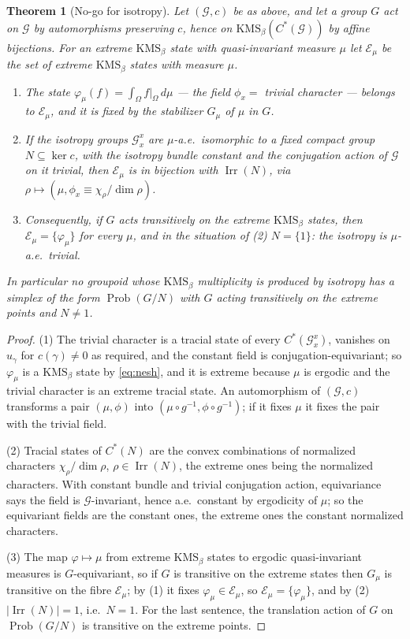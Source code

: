 \documentclass[11pt]{amsart}
\numberwithin{equation}{section}
\newtheorem{theorem}{Theorem}[section]
\theoremstyle{definition}
\theoremstyle{remark}
\newcommand{\cG}{\mathcal{G}}
\newcommand{\Irr}{\operatorname{Irr}}
\newcommand{\Prob}{\operatorname{Prob}}
\begin{document}
\begin{theorem}[No-go for isotropy]\label{thm:isoNoGo}
Let $(\cG,c)$ be as above, and let a group $G$ act on $\cG$ by automorphisms preserving $c$,
hence on $\mathrm{KMS}_\beta(C^*(\cG))$ by affine bijections. For an extreme
$\mathrm{KMS}_\beta$ state with quasi-invariant measure $\mu$ let $\mathcal E_\mu$ be the set
of extreme $\mathrm{KMS}_\beta$ states with measure $\mu$.
\begin{enumerate}
\item The state $\varphi_\mu(f)=\int_\Omega f|_\Omega\,d\mu$ --- the field $\phi_x=$ trivial
character --- belongs to $\mathcal E_\mu$, and it is fixed by the stabilizer $G_\mu$ of
$\mu$ in $G$.
\item If the isotropy groups $\cG_x^x$ are $\mu$-a.e.\ isomorphic to a fixed compact group
$N\subseteq\ker c$, with the isotropy bundle constant and the conjugation action of $\cG$
on it trivial, then $\mathcal E_\mu$ is in bijection with $\Irr(N)$, via
$\rho\mapsto(\mu,\phi_x\equiv\chi_\rho/\dim\rho)$.
\item Consequently, if $G$ acts transitively on the extreme $\mathrm{KMS}_\beta$ states, then
$\mathcal E_\mu=\{\varphi_\mu\}$ for every $\mu$, and in the situation of (2) $N=\{1\}$: the
isotropy is $\mu$-a.e.\ trivial.
\end{enumerate}
In particular no groupoid whose $\mathrm{KMS}_\beta$ multiplicity is produced by isotropy
has a simplex of the form $\Prob(G/N)$ with $G$ acting transitively on the extreme points
and $N\ne1$.
\end{theorem}

\begin{proof}
(1) The trivial character is a tracial state of every $C^*(\cG_x^x)$, vanishes on $u_\gamma$
for $c(\gamma)\ne0$ as required, and the constant field is conjugation-equivariant; so
$\varphi_\mu$ is a $\mathrm{KMS}_\beta$ state by \eqref{eq:nesh}, and it is extreme because
$\mu$ is ergodic and the trivial character is an extreme tracial state. An automorphism of
$(\cG,c)$ transforms a pair $(\mu,\phi)$ into $(\mu\circ g^{-1},\phi\circ g^{-1})$; if it
fixes $\mu$ it fixes the pair with the trivial field.

(2) Tracial states of $C^*(N)$ are the convex combinations of normalized characters
$\chi_\rho/\dim\rho$, $\rho\in\Irr(N)$, the extreme ones being the normalized characters.
With constant bundle and trivial conjugation action, equivariance says the field is
$\cG$-invariant, hence a.e.\ constant by ergodicity of $\mu$; so the equivariant fields
are the constant ones, the extreme ones the constant normalized characters.

(3) The map $\varphi\mapsto\mu$ from extreme $\mathrm{KMS}_\beta$ states to ergodic
quasi-invariant measures is $G$-equivariant, so if $G$ is transitive on the extreme states
then $G_\mu$ is transitive on the fibre $\mathcal E_\mu$; by (1) it fixes $\varphi_\mu\in\mathcal E_\mu$,
so $\mathcal E_\mu=\{\varphi_\mu\}$, and by (2) $|\Irr(N)|=1$, i.e.\ $N=1$. For the last
sentence, the translation action of $G$ on $\Prob(G/N)$ is transitive on the extreme
points.
\end{proof}
\end{document}

